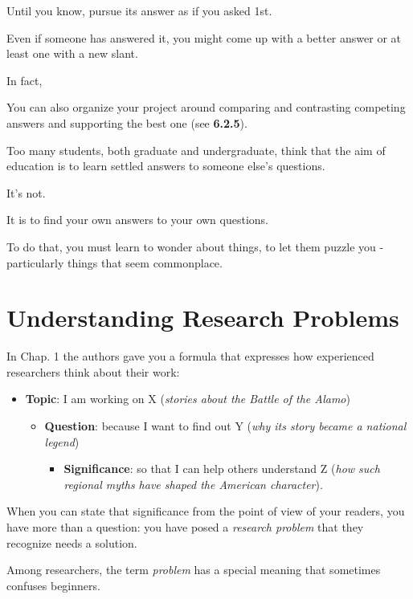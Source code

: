 \documentclass[oneside]{book}
\numberwithin{equation}{section}
\begin{document}
Until you know, pursue its answer as if you asked 1st.

Even if someone has answered it, you might come up with a better answer or at least one with a new slant.

In fact, 

You can also organize your project around comparing and contrasting competing answers and supporting the best one (see \textbf{6.2.5}).

%

Too many students, both graduate and undergraduate, think that the aim of education is to learn settled answers to someone else's questions.

It's not.

It is to find your own answers to your own questions.

To do that, you must learn to wonder about things, to let them puzzle you - particularly things that seem commonplace.

\section{Understanding Research Problems}
In Chap. 1 the authors gave you a formula that expresses how experienced researchers think about their work:
\begin{itemize}
    \item[1.] \textbf{Topic}: I am working on X (\textit{stories about the Battle of the Alamo})
    \begin{itemize}
        \item[2.] \textbf{Question}: because I want to find out Y (\textit{why its story became a national legend})
        \begin{itemize}
            \item[3.] \textbf{Significance}: so that I can help others understand Z (\textit{how such regional myths have shaped the American character}).
        \end{itemize}
    \end{itemize}
\end{itemize}
When you can state that significance from the point of view of your readers, you have more than a question: you have posed a \textit{research problem} that they recognize needs a solution.

%
Among researchers, the term \textit{problem} has a special meaning that sometimes confuses beginners.
\end{document}
